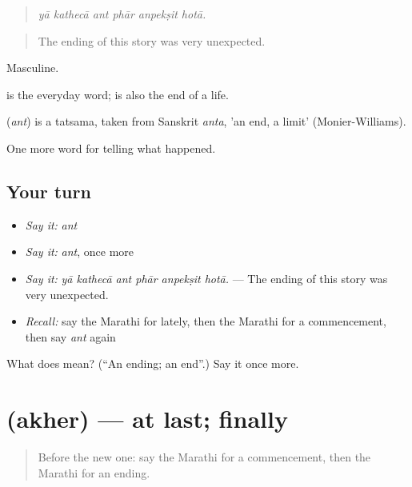 \begin{quote}
\emph{yā kathecā ant phār anpekṣit hotā.}
\end{quote}

\begin{quote}
The ending of this story was very unexpected.
\end{quote}

Masculine.

 is the everyday word;  is also the end of a life.

\begin{cousinweb}
\textbf{} (\emph{ant}) is a tatsama, taken from Sanskrit \emph{anta}, 'an end, a limit' (Monier-Williams).
\end{cousinweb}

\begin{grammarlens}[title={What you've built}]
One more word for telling what happened.
\end{grammarlens}

\subsection*{Your turn}
\begin{itemize}
\raggedright
  \item \emph{Say it:} \emph{ant}
  \item \emph{Say it:} \emph{ant}, once more
  \item \emph{Say it:} \emph{yā kathecā ant phār anpekṣit hotā.} — The ending of this story was very unexpected.
  \item \emph{Recall:} say the Marathi for lately, then the Marathi for a commencement, then say \emph{ant} again
\end{itemize}

\begin{tcolorbox}[breakable,colback=teal!4,colframe=teal!35!black,title={Before you move on}]
What does  mean? (\textquotedblleft{}An ending; an end\textquotedblright{}.) Say it once more.
\end{tcolorbox}
\section[\texorpdfstring{\mr{अखेर} (akher)}{अखेर (akher)}]{ (akher) — at last; finally}

\label{lesson:MR-C307-akher}



\begin{quote}
Before the new one: say the Marathi for a commencement, then the Marathi for an ending.
\end{quote}


